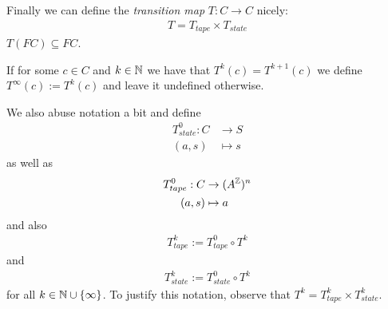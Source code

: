 Finally we can define the \emph{transition map} $T:C\to C$ nicely:
\begin{align*}
	T = T_{tape} \times T_{state}
\end{align*}
\remark $T(FC) \subseteq FC$.

If for some $c \in C$ and $k \in \mathbb{N}$ we have that $T^k(c) = T^{k+1}(c)$ we define $T^\infty(c) := T^k(c)$ and leave it undefined otherwise.

We also abuse notation a bit and define
\begin{align*}
	T_{state}^0: C &\to S \\
	(a,s) &\mapsto s
\end{align*}
as well as
\begin{align*}
	T_{tape}^0: C &\to (A^{\mathbb{Z}})^n \\
	(a,s) &\mapsto a
\end{align*}
and also
\begin{align*}
	T_{tape}^k := T_{tape}^0 \circ T^k
\end{align*}
and
\begin{align*}
	T_{state}^k := T_{state}^0 \circ T^k
\end{align*}
for all $k \in \mathbb{N} \cup \{\infty\}$.
To justify this notation, observe that $T^k = T_{tape}^k \times T_{state}^k$.


